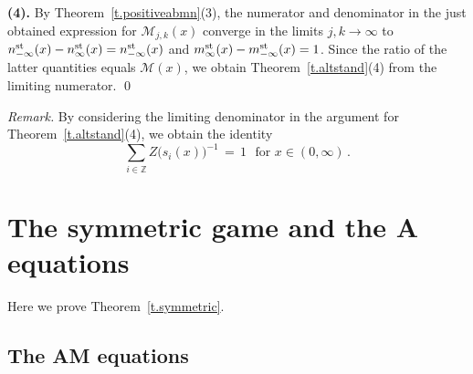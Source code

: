 \documentclass[letterpaper,11pt,oneside,reqno]{amsbook}
\newcommand{\Z}{\ensuremath{\mathbb{Z}}}
\numberwithin{figure}{chapter}
\theoremstyle{definition}
\theoremstyle{definition}
\theoremstyle{definition}
\theoremstyle{definition}
\theoremstyle{definition}
\newcommand{\mst}{m^{\rm st}}
\newcommand{\nst}{n^{\rm st}}
\newcommand{\minamm}{\mathcal{M}}
\newcommand{\ammacspace}{\textrm{AM} }
\newcommand{\amacspace}{\textrm{A} }
\begin{document}
{\bf (4).} By Theorem~\ref{t.positiveabmn}(3), the numerator and denominator in the just obtained expression for $\minamm_{j,k}(x)$ converge in the limits $j,k \to \infty$
to $\nst_{-\infty} (x) - \nst_\infty (x) = \nst_{-\infty} (x)$ and $ \mst_\infty (x) - \mst_{-\infty} (x) = 1$. Since the ratio of the latter quantities equals $\minamm(x)$, 
we obtain  Theorem~\ref{t.altstand}(4) from the limiting numerator. \qed

{\em Remark.} By considering the limiting denominator in the argument for Theorem~\ref{t.altstand}(4), we obtain the identity
$$
 \sum_{i \in \Z} Z\big(s_i(x)\big)^{-1} \, = \, 1 \, \, \, \, \textrm{for $x \in (0,\infty)$} \, .
$$

  



 
\section{The symmetric game and the \amacspace equations}

Here we prove Theorem~\ref{t.symmetric}.

\subsection{The \ammacspace equations}
\end{document}
